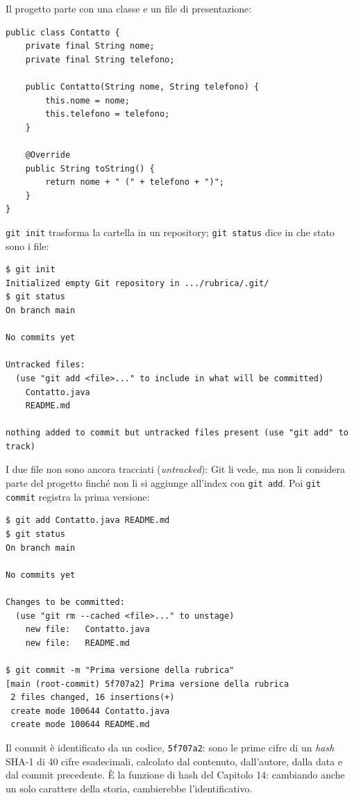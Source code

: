 Il progetto parte con una classe e un file di presentazione:

\begin{lstlisting}[style=java, name=Contatto.java]
public class Contatto {
    private final String nome;
    private final String telefono;

    public Contatto(String nome, String telefono) {
        this.nome = nome;
        this.telefono = telefono;
    }

    @Override
    public String toString() {
        return nome + " (" + telefono + ")";
    }
}
\end{lstlisting}

\texttt{git init} trasforma la cartella in un repository; \texttt{git status} dice in che stato sono i file:

\begin{lstlisting}[style=shell, name=Terminale di Anna, deletestring={[b]'}, deletekeywords={java}]
$ git init
Initialized empty Git repository in .../rubrica/.git/
$ git status
On branch main

No commits yet

Untracked files:
  (use "git add <file>..." to include in what will be committed)
	Contatto.java
	README.md

nothing added to commit but untracked files present (use "git add" to track)
\end{lstlisting}

I due file non sono ancora tracciati (\textit{untracked}): Git li vede, ma non li considera parte del progetto finché
non li si aggiunge all'index con \texttt{git add}. Poi \texttt{git commit} registra la prima versione:

\begin{lstlisting}[style=shell, name=Terminale di Anna, deletestring={[b]'}, deletekeywords={java}]
$ git add Contatto.java README.md
$ git status
On branch main

No commits yet

Changes to be committed:
  (use "git rm --cached <file>..." to unstage)
	new file:   Contatto.java
	new file:   README.md

$ git commit -m "Prima versione della rubrica"
[main (root-commit) 5f707a2] Prima versione della rubrica
 2 files changed, 16 insertions(+)
 create mode 100644 Contatto.java
 create mode 100644 README.md
\end{lstlisting}

Il commit è identificato da un codice, \texttt{5f707a2}: sono le prime cifre di un \textit{hash} SHA-1 di 40 cifre
esadecimali, calcolato dal contenuto, dall'autore, dalla data e dal commit precedente. È la funzione di hash del
Capitolo 14: cambiando anche un solo carattere della storia, cambierebbe l'identificativo.

